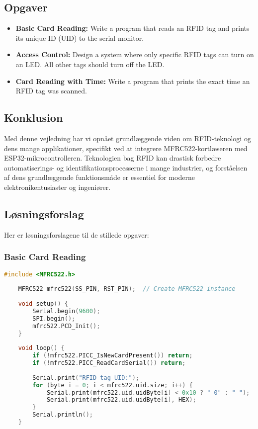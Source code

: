 \subsection*{Opgaver}
\begin{itemize}
	\item \textbf{Basic Card Reading:} Write a program that reads an RFID tag and prints its unique ID (UID) to the serial monitor.
	\item \textbf{Access Control:} Design a system where only specific RFID tags can turn on an LED. All other tags should turn off the LED.
	\item \textbf{Card Reading with Time:} Write a program that prints the exact time an RFID tag was scanned.
\end{itemize}

\subsection*{Konklusion}
Med denne vejledning har vi opnået grundlæggende viden om RFID-teknologi og dens mange applikationer, specifikt ved at integrere MFRC522-kortlæseren med ESP32-mikrocontrolleren. Teknologien bag RFID kan drastisk forbedre automatiserings- og identifikationsprocesserne i mange industrier, og forståelsen af dens grundlæggende funktionsmåde er essentiel for moderne elektronikentusiaster og ingeniører.

\clearpage

\subsection*{Løsningsforslag}
Her er løsningsforslagene til de stillede opgaver:

\subsubsection*{Basic Card Reading}

\begin{lstlisting}[language=C++, caption=Basic Card Reading Solution]
	#include <MFRC522.h>
	
	MFRC522 mfrc522(SS_PIN, RST_PIN);  // Create MFRC522 instance
	
	void setup() {
		Serial.begin(9600);
		SPI.begin();
		mfrc522.PCD_Init();
	}
	
	void loop() {
		if (!mfrc522.PICC_IsNewCardPresent()) return;
		if (!mfrc522.PICC_ReadCardSerial()) return;
		
		Serial.print("RFID tag UID:");
		for (byte i = 0; i < mfrc522.uid.size; i++) {
			Serial.print(mfrc522.uid.uidByte[i] < 0x10 ? " 0" : " ");
			Serial.print(mfrc522.uid.uidByte[i], HEX);
		}
		Serial.println();
	}
\end{lstlisting}

